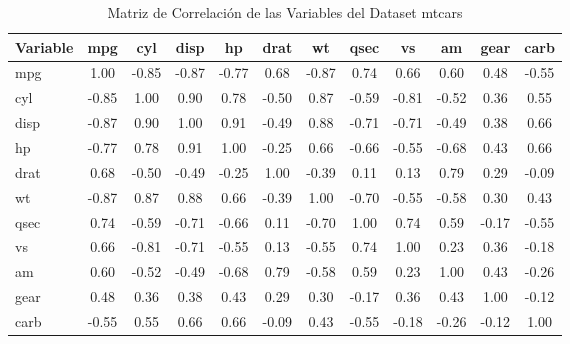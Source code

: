 \documentclass{article}
\begin{document}
\begin{table}[h]
    \centering
    \begin{tabular}{lccccccccccc}
        \hline
        Variable & mpg   & cyl   & disp  & hp    & drat  & wt    & qsec  & vs    & am    & gear  & carb  \\ \hline
        mpg      & 1.00  & -0.85 & -0.87 & -0.77 & 0.68  & -0.87 & 0.74  & 0.66  & 0.60  & 0.48  & -0.55 \\
        cyl      & -0.85 & 1.00  & 0.90  & 0.78  & -0.50 & 0.87  & -0.59 & -0.81 & -0.52 & 0.36  & 0.55  \\
        disp     & -0.87 & 0.90  & 1.00  & 0.91  & -0.49 & 0.88  & -0.71 & -0.71 & -0.49 & 0.38  & 0.66  \\
        hp       & -0.77 & 0.78  & 0.91  & 1.00  & -0.25 & 0.66  & -0.66 & -0.55 & -0.68 & 0.43  & 0.66  \\
        drat     & 0.68  & -0.50 & -0.49 & -0.25 & 1.00  & -0.39 & 0.11  & 0.13  & 0.79  & 0.29  & -0.09 \\
        wt       & -0.87 & 0.87  & 0.88  & 0.66  & -0.39 & 1.00  & -0.70 & -0.55 & -0.58 & 0.30  & 0.43  \\
        qsec     & 0.74  & -0.59 & -0.71 & -0.66 & 0.11  & -0.70 & 1.00  & 0.74  & 0.59  & -0.17 & -0.55 \\
        vs       & 0.66  & -0.81 & -0.71 & -0.55 & 0.13  & -0.55 & 0.74  & 1.00  & 0.23  & 0.36  & -0.18 \\
        am       & 0.60  & -0.52 & -0.49 & -0.68 & 0.79  & -0.58 & 0.59  & 0.23  & 1.00  & 0.43  & -0.26 \\
        gear     & 0.48  & 0.36  & 0.38  & 0.43  & 0.29  & 0.30  & -0.17 & 0.36  & 0.43  & 1.00  & -0.12 \\
        carb     & -0.55 & 0.55  & 0.66  & 0.66  & -0.09 & 0.43  & -0.55 & -0.18 & -0.26 & -0.12 & 1.00  \\ \hline
    \end{tabular}
    \caption{Matriz de Correlación de las Variables del Dataset mtcars}
    \label{tab:correlation_matrix}
\end{table}
\end{document}
